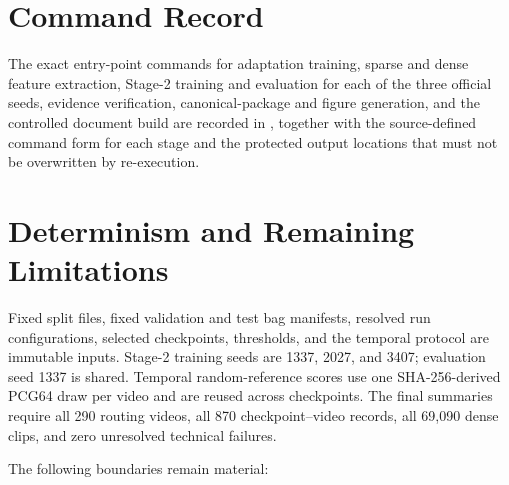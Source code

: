 \section{Command Record}
\label{app:commands}

The exact entry-point commands for adaptation training, sparse and dense feature extraction, Stage-2 training and evaluation for each of the three official seeds, evidence verification, canonical-package and figure generation, and the controlled document build are recorded in , together with the source-defined command form for each stage and the protected output locations that must not be overwritten by re-execution.

\section{Determinism and Remaining Limitations}
\label{app:repro-limits}

Fixed split files, fixed validation and test bag manifests, resolved run configurations, selected checkpoints, thresholds, and the temporal protocol are immutable inputs. Stage-2 training seeds are 1337, 2027, and 3407; evaluation seed 1337 is shared. Temporal random-reference scores use one SHA-256-derived PCG64 draw per video and are reused across checkpoints. The final summaries require all 290 routing videos, all 870 checkpoint--video records, all 69,090 dense clips, and zero unresolved technical failures.

The following boundaries remain material:


